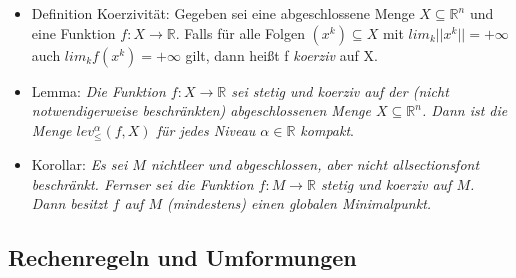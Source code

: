 \documentclass[paper=a4, fontsize=11pt]{scrartcl} %
\numberwithin{equation}{section} %
\numberwithin{figure}{section} %
\numberwithin{table}{section} %
\begin{document}
\begin{itemize}
\item Definition Koerzivität: Gegeben sei eine abgeschlossene Menge $X \subseteq \mathbb{R}^n$ und eine Funktion $f:X \rightarrow \mathbb{R}$. Falls für alle Folgen $(x^k) \subseteq X$ mit $lim_k ||x^k|| = +\infty$ auch $lim_k f(x^k) = + \infty$ gilt, dann heißt f \textit{koerziv} auf X.
\item Lemma: \textit{Die Funktion $f: X \rightarrow \mathbb{R}$ sei stetig und koerziv auf der (nicht notwendigerweise beschränkten) abgeschlossenen Menge $X \subseteq \mathbb{R}^n$. Dann ist die Menge $lev^\alpha_\le(f,X)$ für jedes Niveau $\alpha \in \mathbb{R}$ kompakt}.
\item Korollar: \textit{Es sei $M$ nichtleer und abgeschlossen, aber nicht allsectionsfont beschränkt. Fernser sei die Funktion $f: M \rightarrow \mathbb{R}$ stetig und koerziv auf $M$. Dann besitzt $f$ auf $M$ (mindestens) einen globalen Minimalpunkt.}
\end{itemize}

\subsection{Rechenregeln und Umformungen}
\end{document}
